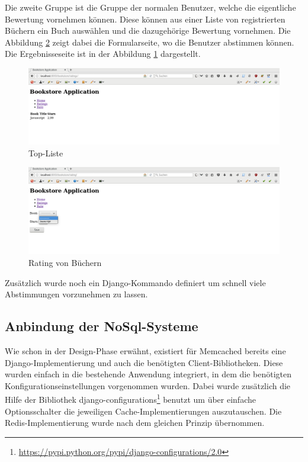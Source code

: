 Die zweite Gruppe ist die Gruppe der normalen Benutzer, welche die eigentliche
Bewertung vornehmen können. Diese können aus einer Liste von registrierten
Büchern ein Buch auswählen und die dazugehörige Bewertung vornehmen. Die
Abbildung \ref{fig:django-rate} zeigt dabei die Formularseite, wo die Benutzer 
abstimmen können. Die Ergebnisseseite ist in der Abbildung \ref{fig:django-list}
dargestellt.

\begin{figure}
\centering
\includegraphics[scale=0.25]{images/Ratings.png}
\caption{Top-Liste}
\label{fig:django-list}
\end{figure}

\begin{figure}
\centering
\includegraphics[scale=0.25]{images/Rating.png}
\caption{Rating von Büchern}
\label{fig:django-rate}
\end{figure}

Zusätzlich wurde noch ein Django-Kommando definiert um schnell viele Abstimmungen
vorzunehmen zu lassen.

\subsection{Anbindung der NoSql-Systeme}
Wie schon in der Design-Phase erwähnt, existiert für Memcached bereits eine
Django-Implementierung und auch die benötigten Client-Bibliotheken. Diese wurden
einfach in die bestehende Anwendung integriert, in dem die benötigten
Konfigurationseinstellungen vorgenommen wurden. Dabei wurde zusätzlich die Hilfe
der Bibliothek django-configurations\footnote{\url{https://pypi.python.org/pypi/django-configurations/2.0}}
benutzt um über einfache Optionsschalter die jeweiligen Cache-Implementierungen
auszutauschen. Die Redis-Implementierung wurde nach dem gleichen Prinzip
übernommen.

